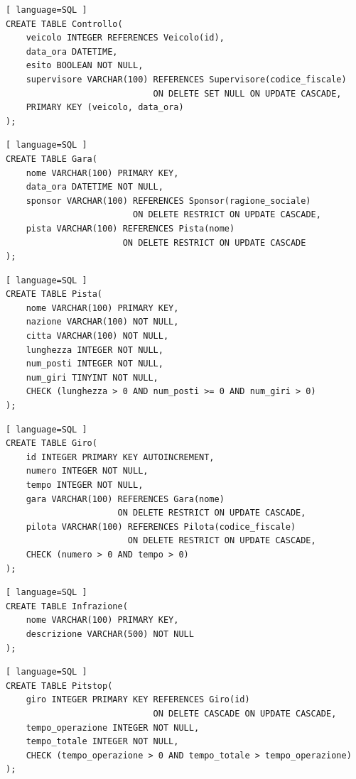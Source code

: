 \documentclass[11pt]{article}
\begin{document}
\begin{lstlisting}[ language=SQL ]
CREATE TABLE Controllo(
    veicolo INTEGER REFERENCES Veicolo(id),
    data_ora DATETIME,
    esito BOOLEAN NOT NULL,
    supervisore VARCHAR(100) REFERENCES Supervisore(codice_fiscale) 
                             ON DELETE SET NULL ON UPDATE CASCADE,
    PRIMARY KEY (veicolo, data_ora)
);
\end{lstlisting}

\newpage
\begin{lstlisting}[ language=SQL ]
CREATE TABLE Gara(
    nome VARCHAR(100) PRIMARY KEY,
    data_ora DATETIME NOT NULL,
    sponsor VARCHAR(100) REFERENCES Sponsor(ragione_sociale) 
                         ON DELETE RESTRICT ON UPDATE CASCADE,
    pista VARCHAR(100) REFERENCES Pista(nome) 
                       ON DELETE RESTRICT ON UPDATE CASCADE
);
\end{lstlisting}

\begin{lstlisting}[ language=SQL ]
CREATE TABLE Pista(
    nome VARCHAR(100) PRIMARY KEY,
    nazione VARCHAR(100) NOT NULL,
    citta VARCHAR(100) NOT NULL,
    lunghezza INTEGER NOT NULL,
    num_posti INTEGER NOT NULL,
    num_giri TINYINT NOT NULL,
    CHECK (lunghezza > 0 AND num_posti >= 0 AND num_giri > 0)
);
\end{lstlisting}

\begin{lstlisting}[ language=SQL ]
CREATE TABLE Giro(
    id INTEGER PRIMARY KEY AUTOINCREMENT,
    numero INTEGER NOT NULL,
    tempo INTEGER NOT NULL,
    gara VARCHAR(100) REFERENCES Gara(nome) 
                      ON DELETE RESTRICT ON UPDATE CASCADE,
    pilota VARCHAR(100) REFERENCES Pilota(codice_fiscale) 
                        ON DELETE RESTRICT ON UPDATE CASCADE,
    CHECK (numero > 0 AND tempo > 0)
);
\end{lstlisting}

\begin{lstlisting}[ language=SQL ]
CREATE TABLE Infrazione(
    nome VARCHAR(100) PRIMARY KEY,
    descrizione VARCHAR(500) NOT NULL
);
\end{lstlisting}

\begin{lstlisting}[ language=SQL ]
CREATE TABLE Pitstop(
    giro INTEGER PRIMARY KEY REFERENCES Giro(id) 
                             ON DELETE CASCADE ON UPDATE CASCADE,
    tempo_operazione INTEGER NOT NULL,
    tempo_totale INTEGER NOT NULL,
    CHECK (tempo_operazione > 0 AND tempo_totale > tempo_operazione)
);
\end{lstlisting}
\end{document}
